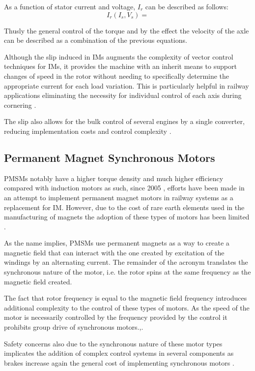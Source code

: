As a function of stator current and voltage, $I_r$ can be described as follows:
\begin{equation}
    I_r(I_s,V_s) = 
\end{equation}

Thusly the general control of the torque and by the effect the velocity of the axle can be described as a combination of the previous equations.

Although the slip induced in IMs augments the complexity of vector control techniques for IMs, it provides the machine with an inherit means to support changes of speed in the rotor without needing to specifically determine the appropriate current for each load variation. This is particularly helpful in railway applications eliminating the necessity for individual control of each axis during cornering \cite{MainSOTA}.

The slip also allows for the bulk control of several engines by a single converter, reducing implementation costs and control complexity \cite{Motor-SOTA}.

\subsection{Permanent Magnet Synchronous Motors}
PMSMs notably have a higher torque density and much higher efficiency compared with induction motors as such, since 2005 \cite{Motor-SOTA}, efforts have been made in an attempt to implement permanent magnet motors in railway systems as a replacement for IM. However, due to the cost of rare earth elements used in the manufacturing of magnets the adoption of these types of motors has been limited \cite{MainSOTA}.

As the name implies, PMSMs use permanent magnets as a way to create a magnetic field that can interact with the one created by excitation of the windings by an alternating current. The remainder of the acronym  translates the synchronous nature of the motor, i.e. the rotor spins at the same frequency as the magnetic field created.

The fact that rotor frequency is equal to the magnetic field frequency introduces additional complexity to the control of these types of motors. As the speed of the motor is necessarily controlled by the frequency provided by the control it prohibits group drive of synchronous motors.\cite{MainSOTA},\cite{Motor-SOTA}. 

Safety concerns also due to the synchronous nature of these motor types implicates the addition of complex control systems in several components as brakes increase again the general cost of implementing synchronous motors \cite{Motor-SOTA}.

